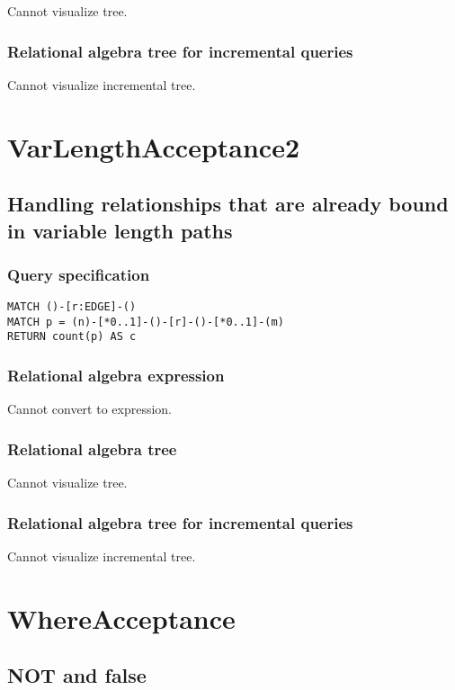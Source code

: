 Cannot visualize tree.

\subsubsection*{Relational algebra tree for incremental queries}

Cannot visualize incremental tree.

\section{VarLengthAcceptance2}

\subsection{Handling relationships that are already bound in variable length paths}

\subsubsection*{Query specification}

\begin{lstlisting}
MATCH ()-[r:EDGE]-()
MATCH p = (n)-[*0..1]-()-[r]-()-[*0..1]-(m)
RETURN count(p) AS c
\end{lstlisting}

\subsubsection*{Relational algebra expression}

Cannot convert to expression.

\subsubsection*{Relational algebra tree}

Cannot visualize tree.

\subsubsection*{Relational algebra tree for incremental queries}

Cannot visualize incremental tree.

\section{WhereAcceptance}

\subsection{NOT and false}

